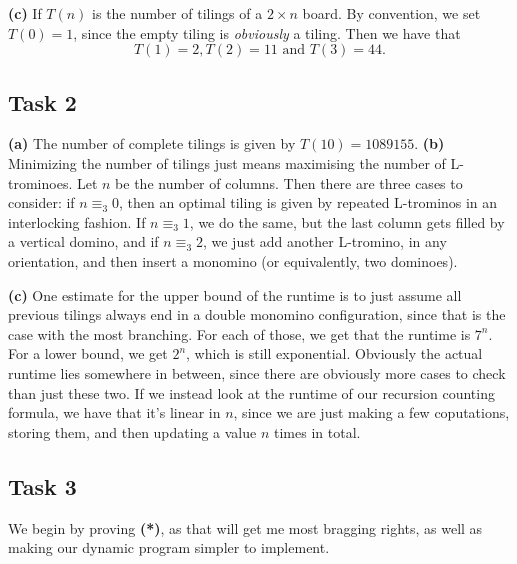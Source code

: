 \documentclass[11pt,a4paper]{article}
\begin{document}
\textbf{(c)} If $T(n)$ is the number of tilings of a $2\times n$ board. By convention, we set $T(0) = 1$, since the empty tiling is \textit{obviously} a tiling. Then 
we have that  \[
 T(1) = 2, T(2) = 11 \text{ and } T(3) = 44.
\] 

\subsection*{Task 2}
\textbf{(a)} The number of complete tilings is given by $T(10) = 1089155$.
\textbf{(b)} Minimizing the number of tilings just means maximising the number of L-trominoes. Let $n$ be the number of columns. Then there are three cases to consider:
if  $n \equiv_{3} 0$, then an optimal tiling is given by repeated L-trominos in an interlocking fashion. 
If $n\equiv_{3} 1$, we do the same, but the last column gets filled by a vertical domino, and if $n \equiv_{3} 2$, we just add another L-tromino, in any orientation, and then insert a monomino (or equivalently, two dominoes). 

\textbf{(c)} One estimate for the upper bound of the runtime is to just assume
all previous tilings always end in a double monomino configuration, since that is the case with the most branching. For each of those, we get that
the runtime is $7^{n}$. For a lower bound, we get $2^{n}$, which is still exponential.
Obviously the actual runtime lies somewhere in between, since there are obviously more cases to check than just these two. If we instead look at the runtime of our recursion counting formula, we have that it's linear in $n$, since we are just making a few coputations, storing them, and then updating a value $n$ times in total.

\subsection*{Task 3}
We begin by proving \textbf{(*)}, as that will get me most bragging rights, as well as making our dynamic program simpler to implement.
\end{document}
